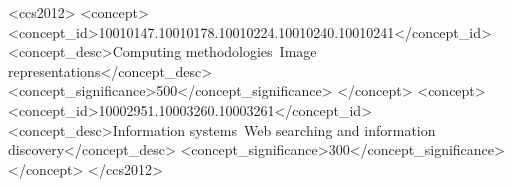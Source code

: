 \documentclass[sigconf]{acmart}
\begin{document}
\begin{CCSXML}
<ccs2012>
<concept>
<concept_id>10010147.10010178.10010224.10010240.10010241</concept_id>
<concept_desc>Computing methodologies~Image representations</concept_desc>
<concept_significance>500</concept_significance>
</concept>
<concept>
<concept_id>10002951.10003260.10003261</concept_id>
<concept_desc>Information systems~Web searching and information discovery</concept_desc>
<concept_significance>300</concept_significance>
</concept>
</ccs2012>
\end{CCSXML}









\maketitle



\newcommand\reminder[1]{\textcolor{blue}{#1}}
\newcommand{\ie}{{\textit i.e.}}
\newcommand{\eg}{{\textit e.g.}}
\newcommand{\coclickgraph}{co-graph~}
\newcommand{\vsigraph}{vis-graph~}


\newcommand{\ourmodel}[0]{Graph-RISE}



\newcommand{\figleft}{{\em (Left)}}
\newcommand{\figcenter}{{\em (Center)}}
\newcommand{\figright}{{\em (Right)}}
\newcommand{\figtop}{{\em (Top)}}
\newcommand{\figbottom}{{\em (Bottom)}}
\newcommand{\captiona}{{\em (a)}}
\newcommand{\captionb}{{\em (b)}}
\newcommand{\captionc}{{\em (c)}}
\newcommand{\captiond}{{\em (d)}}

\newcommand{\newterm}[1]{{\bf #1}}


\def\figref#1{figure~\ref{#1}}
\def\Figref#1{Figure~\ref{#1}}
\def\twofigref#1#2{figures \ref{#1} and \ref{#2}}
\def\quadfigref#1#2#3#4{figures \ref{#1}, \ref{#2}, \ref{#3} and \ref{#4}}
\def\secref#1{section~\ref{#1}}
\def\Secref#1{Section~\ref{#1}}
\def\twosecrefs#1#2{sections \ref{#1} and \ref{#2}}
\def\secrefs#1#2#3{sections \ref{#1}, \ref{#2} and \ref{#3}}
\def\eqref#1{equation~\ref{#1}}
\def\Eqref#1{Equation~\ref{#1}}
\def\plaineqref#1{\ref{#1}}
\def\chapref#1{chapter~\ref{#1}}
\def\Chapref#1{Chapter~\ref{#1}}
\def\rangechapref#1#2{chapters\ref{#1}--\ref{#2}}
\def\algref#1{algorithm~\ref{#1}}
\def\Algref#1{Algorithm~\ref{#1}}
\def\twoalgref#1#2{algorithms \ref{#1} and \ref{#2}}
\def\Twoalgref#1#2{Algorithms \ref{#1} and \ref{#2}}
\def\partref#1{part~\ref{#1}}
\def\Partref#1{Part~\ref{#1}}
\def\twopartref#1#2{parts \ref{#1} and \ref{#2}}
\end{document}
